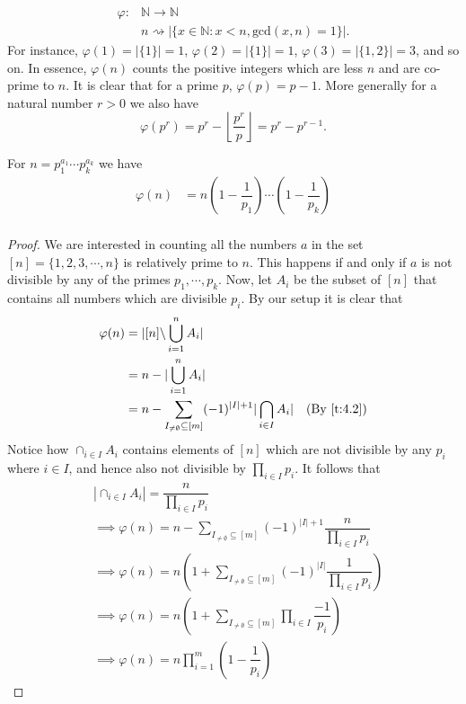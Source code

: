 \begin{align*}
    \varphi: &\mathbb{N}\to \mathbb{N} \\
    &n\rightsquigarrow |\{x\in\mathbb{N}: x< n, \text{gcd}(x,n)=1\}|.
\end{align*}
For instance, $\varphi(1)=|\{1\}|=1$, $\varphi(2)=|\{1\}|=1$, $\varphi(3)=|\{1,2\}|=3$, and so on. In essence, $\varphi(n)$ counts the positive integers which are less $n$ and are co-prime to $n$. It is clear that for a prime $p$, $\varphi(p) = p-1$. More generally for a natural number $r>0$ we also have
\[
\varphi(p^r) = p^r-\left\lfloor \dfrac{p^r}{p}\right\rfloor = p^r-p^{r-1}.
\]

\begin{theorem}
For $n=p_1^{a_1}\cdots p_k^{a_k}$ we have 
\begin{align*}
\varphi(n) &= n\left(1-\dfrac{1}{p_1}\right)\cdots\left(1-\dfrac{1}{p_k}\right) \\
\end{align*}
\end{theorem}
\begin{proof}
We are interested in counting all the numbers $a$ in the set $[n]=\{1,2,3,\cdots,n\}$ is relatively prime to $n$. This happens if and only if $a$ is not divisible by any of the primes $p_1,\cdots,p_k$. Now, let $A_i$ be the subset of $[n]$ that contains all numbers which are divisible $p_i$. By our setup it is clear that 
\begin{align*}
\varphi(n) &= |[n]\backslash \bigcup_{i=1}^{n}A_i| \\
&= n - |\bigcup_{i=1}^{n}A_i| \\
&= n - \sum_{I_{\neq \emptyset}\subseteq [m]}(-1)^{|I|+1}|\bigcap_{i\in I}A_i| \quad \text{(By \cref{t:4.2})}
\end{align*}
Notice how $\cap_{i\in I}A_i$ contains elements of $[n]$ which are not divisible by any $p_i$ where $i\in I$, and hence also not divisible by $\prod_{i\in I}p_i$. It follows that
\begin{align*}
&|\cap_{i\in I}A_i| = \dfrac{n}{\prod_{i\in I}p_i} \\
&\implies \varphi(n) = n - \sum_{I_{\neq \emptyset}\subseteq [m]}(-1)^{|I|+1}\dfrac{n}{\prod_{i\in I}p_i} \\
&\implies \varphi(n) = n\left(1+\sum_{I_{\neq\emptyset}\subseteq [m]}(-1)^{|I|}\dfrac{1}{\prod_{i\in I}p_i}\right) \\
&\implies \varphi(n) = n\left(1+\sum_{I_{\neq\emptyset}\subseteq [m]}\prod_{i\in I}\dfrac{-1}{p_i}\right) \\
&\implies \varphi(n) = n\prod_{i=1}^{m}\left(1-\dfrac{1}{p_i}\right)
\end{align*}

\end{proof}
